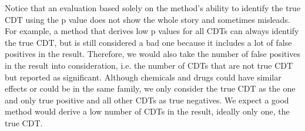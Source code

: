 

Notice that an evaluation based solely on the method's ability to identify the true CDT using the p value does not show the whole story and sometimes misleads.
For example, a method that derives low p values for all CDTs can always identify the true CDT, but is still considered a bad one because it includes a lot of false positives in the result.
Therefore, we would also take the number of false positives in the result into consideration, i.e. the number of CDTs that are not true CDT but reported as significant. %
Although chemicals and drugs could have similar effects or could be in the same family, we only consider the true CDT as the one and only true positive and all other CDTs as true negatives.
We expect a good method would derive a low number of CDTs in the result, ideally only one, the true CDT.



